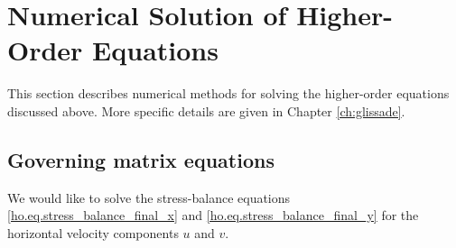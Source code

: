 
\section{Numerical Solution of Higher-Order Equations}
\label{sc:higher-order-numerics}

This section describes numerical methods for solving the higher-order equations discussed above. More specific details are given in Chapter \ref{ch:glissade}.

\subsection{Governing matrix equations}
We would like to solve the stress-balance equations \eqref{ho.eq.stress_balance_final_x} and \eqref{ho.eq.stress_balance_final_y} for the
horizontal velocity components $u$ and $v$.
